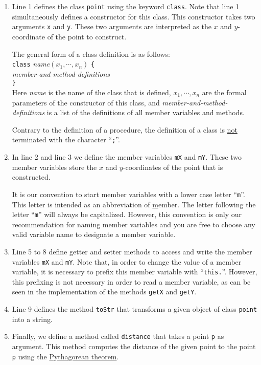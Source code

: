 \begin{enumerate}
\item Line 1 defines the class \texttt{point} using the keyword \texttt{class}.  Note that
      line 1 simultaneously defines a constructor for this class.  This constructor takes two
      arguments \texttt{x} and \texttt{y}.  These two arguments are interpreted as the $x$ and
      $y$-coordinate of the point to construct.

      The general form of a class definition is as follows:
      \\[0.2cm]
      \hspace*{1.3cm}
      \texttt{class} \textsl{name}$(x_1, \cdots, x_n)$ \texttt{\{}  
      \\
      \hspace*{2.0cm} \textsl{member-and-method-definitions}
      \\
      \hspace*{1.3cm}
      \texttt{\}}
      \\[0.2cm]
      Here \textsl{name} is the name of the class that is defined, $x_1, \cdots, x_n$ are the formal
      parameters of the constructor of this class, and \textsl{member-and-method-definitions} is a
      list of the definitions of all member variables and methods.

      Contrary to the definition of a procedure, the definition of a class is \underline{not}
      terminated with the character ``\texttt{;}''.
\item In line 2 and line 3 we define the member variables \texttt{mX} and \texttt{mY}.  These two
      member variables store the $x$ and $y$-coordinates of the point that is constructed.

      It is our convention to start member variables with a lower case letter ``\texttt{m}''.  This
      letter is intended as an abbreviation of \underline{m}ember.  The letter following the letter
      ``\texttt{m}'' will always be capitalized.  However, this convention is only our
      recommendation for naming member variables and you are free to choose any valid variable name
      to designate a member variable.
\item Line 5 to 8 define getter and setter methods to access and write the member variables
      \texttt{mX} and \texttt{mY}.  Note that, in order to change the value of a member variable, it
      is necessary to prefix this member variable with ``\texttt{this.}''.  However, this prefixing is not
      necessary in order to read a member variable, as can be seen in the implementation of the
      methods \texttt{getX} and \texttt{getY}.
\item Line 9 defines the method \texttt{toStr} that transforms a given object of class
      \texttt{point} into a string.
\item Finally, we define a method called \texttt{distance} that takes a point \texttt{p} as
      argument.  This method computes the distance of the given point to the point \texttt{p}
      using the \href{http://en.wikipedia.org/wiki/Pythagorean_theorem}{Pythagorean theorem}.
\end{enumerate}
